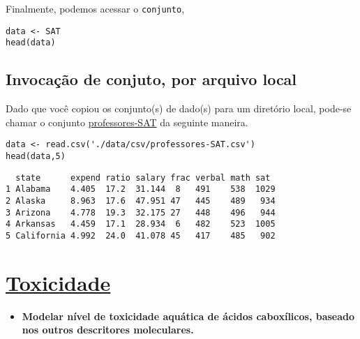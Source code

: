 \documentclass[12pt]{abntex2}
\begin{document}
Finalmente, podemos acessar o \texttt{conjunto},
\begin{verbatim}
data <- SAT
head(data)
\end{verbatim}

\subsection{Invocação de conjuto, por arquivo local}
\label{sec:org915e2ad}

Dado que você copiou os conjunto(s) de dado(s) para um diretório
local, pode-se chamar o conjunto \href{https://drive.google.com/file/d/1E6aOdH1nf0qF4Lky131iX1LNBjaIYAev/view?usp=sharing}{professores-SAT} da seguinte maneira.

\begin{verbatim}
data <- read.csv('./data/csv/professores-SAT.csv')
head(data,5)
\end{verbatim}

\begin{verbatim}
  state      expend ratio salary frac verbal math sat 
1 Alabama    4.405  17.2  31.144  8   491    538  1029
2 Alaska     8.963  17.6  47.951 47   445    489   934
3 Arizona    4.778  19.3  32.175 27   448    496   944
4 Arkansas   4.459  17.1  28.934  6   482    523  1005
5 California 4.992  24.0  41.078 45   417    485   902
\end{verbatim}

\section{\href{https://r-data.pmagunia.com/dataset/r-dataset-package-robustbase-toxicity}{Toxicidade}}
\label{sec:org40e4d0c}
\begin{itemize}
\item \textbf{Modelar nível de toxicidade aquática de ácidos caboxílicos, baseado nos outros descritores moleculares.}
\end{itemize}
\end{document}
